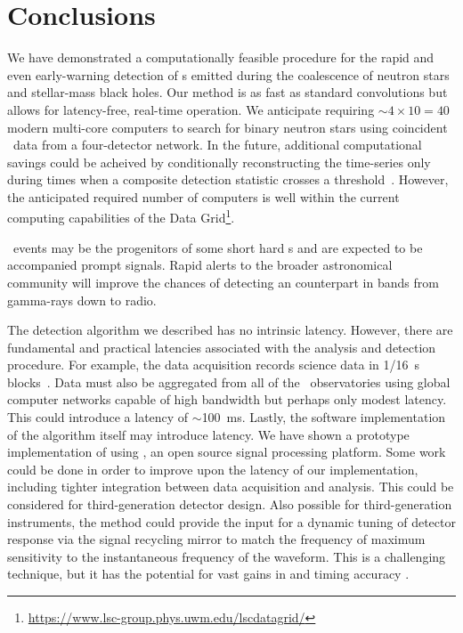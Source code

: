 \section{Conclusions}
\label{sec:conclusions}

We have demonstrated a computationally feasible procedure for the rapid and
even early-warning detection of \GW{}s emitted during the coalescence of
neutron stars and stellar-mass black holes. Our method is as fast as standard
\fft{} convolutions but allows for latency-free, real-time operation.  We
anticipate requiring $\sim 4 \times 10 = 40$ modern multi-core computers to
search for binary neutron stars using coincident \GW\ data from a four-detector
network.  In the future, additional computational savings could be acheived by
conditionally reconstructing the \SNR{} time-series only during times when a
composite detection statistic crosses a threshold~\citep{svd-compdetstat}.
However, the anticipated required number of computers is well within the
current computing capabilities of the \LIGO{} Data
Grid\footnote{\url{https://www.lsc-group.phys.uwm.edu/lscdatagrid/}}.

\CBC\ events may be the progenitors of some short hard \GRB{}s and are expected
to be accompanied prompt \EM{} signals.  Rapid alerts to the broader
astronomical community will improve the chances of detecting an \EM{}
counterpart in bands from gamma-rays down to radio.

The detection algorithm we described has no intrinsic latency.  However, there
are fundamental and practical latencies associated with the analysis and
detection procedure. For example, the \LIGO{} data acquisition records science
data in 1/16~s blocks~\citep{Bork2001}. Data must also be aggregated from all
of the \GW\ observatories using global computer networks capable of high
bandwidth but perhaps only modest latency.  This could introduce a latency of
$\sim$100~ms.  Lastly, the software implementation of the algorithm itself may
introduce latency.  We have shown a prototype implementation of \lloid{} using
\gstreamer, an open source signal processing platform. Some work could
be done in order to improve upon the latency of our implementation,
including tighter integration between data acquisition and analysis. This could
be considered for third-generation detector design.  Also possible for
third-generation instruments, the \lloid{} method could provide the input for a
dynamic tuning of detector response via the signal recycling mirror to match
the frequency of maximum sensitivity to the instantaneous frequency of the
\GW{} waveform.  This is a challenging technique, but it has the potential for
vast gains in \SNR{} and timing accuracy \citep{PhysRevD.47.2184}.

